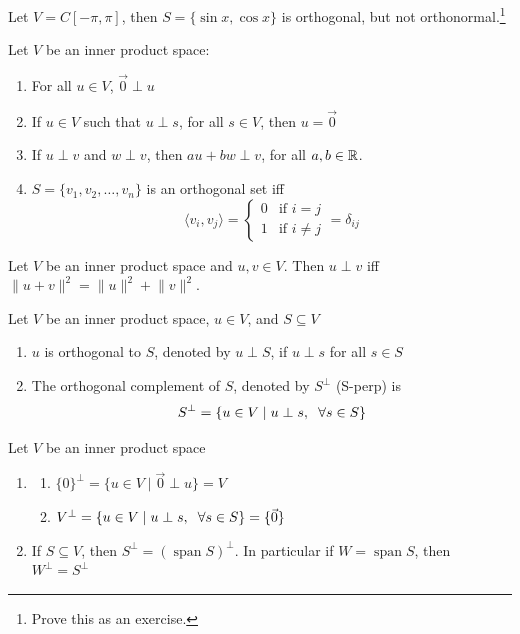 \begin{example}
Let $V = C[-\pi, \pi]$, then $S = \{\sin x, \cos x\}$ is orthogonal, but not orthonormal.\footnote{Prove this as an exercise.}
\end{example}

\begin{remark}
Let $V$ be an inner product space:
\begin{enumerate}
    \item For all $u \in V$, $\vec{0} \perp u$
    \item If $u \in V$ such that $u \perp s$, for all $s \in V$, then $u = \vec{0}$
    \item If $u \perp v$ and $w \perp v$, then $au + bw \perp v$, for all $a, b \in \mathbb{R}$.
    \item $S = \{v_1, v_2, \dots, v_n\}$ is an orthogonal set iff
    $$\langle v_i, v_j \rangle = \begin{cases}
        0 & \text{if $i = j$} \\
        1 & \text{if $i \neq j$}
    \end{cases} = \delta_{ij}$$
\end{enumerate}
\end{remark}

\begin{theorem}
Let $V$ be an inner product space and $u, v \in V$. Then $u \perp v$ iff $\lVert u + v \rVert^2 = \lVert u \rVert ^2 + \lVert v \rVert^2$.
\end{theorem}

\newpage
\begin{definition}
Let $V$ be an inner product space, $u \in V$, and $S \subseteq V$
\begin{enumerate}
    \item $u$ is orthogonal to $S$, denoted by $u \perp S$, if $u \perp s$ for all $s \in S$
    \item The orthogonal complement of $S$, denoted by $S^\perp$ (S-perp) is
    $$S^\perp = \{u \in V \mid u \perp s, \hspace{0.2cm} \forall s \in S\}$$
\end{enumerate}
\end{definition}

\begin{remark}
Let $V$ be an inner product space
\begin{enumerate}
    \item 
    \begin{enumerate}
        \item $\{0\}^\perp = \{u \in V \mid \vec{0} \perp u\} = V$
        \item $V^\perp = \{u \in V \mid u \perp s, \hspace{0.2cm} \forall s \in S\} = \{\vec{0}\}$
    \end{enumerate}
    \item If $S \subseteq V$, then $S^\perp = (\operatorname{span} S)^\perp$. In particular if $W = \operatorname{span} S$, then $W^\perp = S^\perp$
\end{enumerate}
\end{remark}

